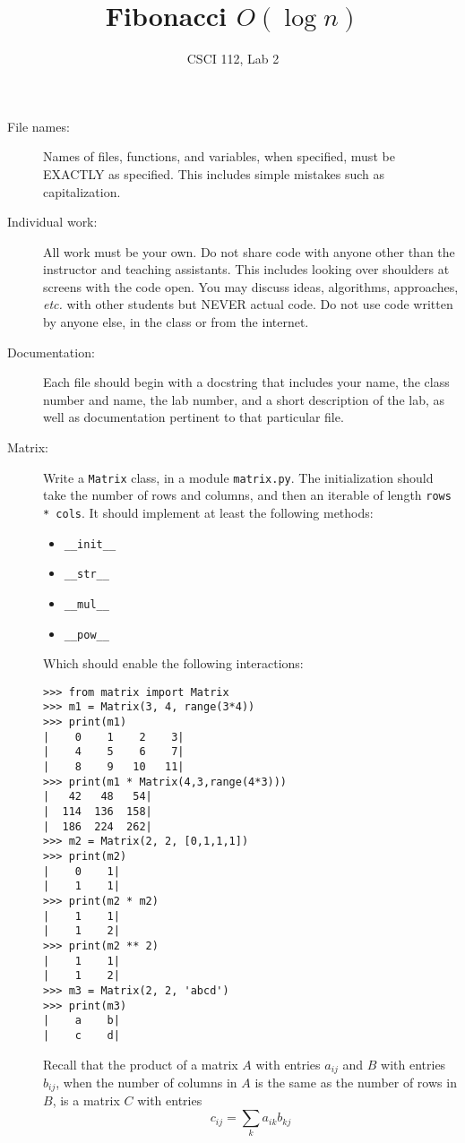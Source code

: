 \documentclass{article}
\title{Fibonacci $O(\log n)$}
\author{CSCI 112, Lab 2}
\date{}
\newcommand{\bi}{\begin{itemize}}
\newcommand{\li}{\item}
\newcommand{\ei}{\end{itemize}}
\begin{document}
\sloppy

\maketitle

\begin{description} 
\item[File names:]  Names of files, functions, and variables, 
when specified,
must be EXACTLY as specified.  This includes simple mistakes such
as capitalization.

\item[Individual work:]  All work must be your own.  Do not share
code with anyone other than the instructor and teaching assistants.
This includes looking over shoulders at screens with the code open.
You may discuss ideas, algorithms, approaches, {\em etc.} with
other students but NEVER actual code.  Do not use code
written by anyone else, in the class or from the internet.

\item[Documentation:] Each file should begin with a docstring
that includes your name, the class number and name, the lab
number, and  
a short description of the lab, as well as documentation pertinent
to that particular file.

\item[Matrix:]  Write a \lstinline{Matrix} class, in a module \lstinline{matrix.py}.
The initialization should take the number of rows and columns,
and then an iterable of length \lstinline{rows * cols}.
  It should 
implement at least the following methods:
\bi
\li \lstinline{__init__}
\li \lstinline{__str__}
\li \lstinline{__mul__}
\li \lstinline{__pow__}
\ei
Which should enable the following interactions:
\begin{lstlisting}
>>> from matrix import Matrix
>>> m1 = Matrix(3, 4, range(3*4))
>>> print(m1)
|    0    1    2    3|
|    4    5    6    7|
|    8    9   10   11|
>>> print(m1 * Matrix(4,3,range(4*3)))
|   42   48   54|
|  114  136  158|
|  186  224  262|
>>> m2 = Matrix(2, 2, [0,1,1,1])
>>> print(m2)
|    0    1|
|    1    1|
>>> print(m2 * m2)
|    1    1|
|    1    2|
>>> print(m2 ** 2)
|    1    1|
|    1    2|
>>> m3 = Matrix(2, 2, 'abcd')
>>> print(m3)
|    a    b|
|    c    d|
\end{lstlisting}

Recall that the product of a matrix $A$ with entries $a_{ij}$
and $B$ with entries $b_{ij}$, when the number of columns in $A$ is
the same as the number of rows in $B$,
 is a matrix $C$
with entries
\[
c_{ij} = \sum_k a_{ik}b_{kj}
\]


\end{description}
\end{document}
